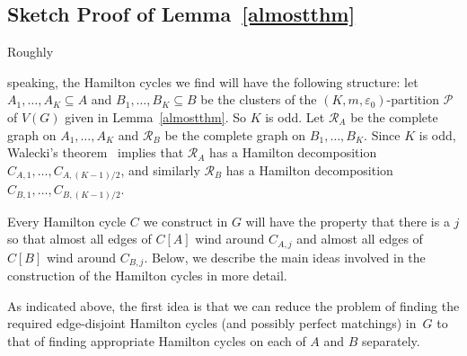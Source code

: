 \documentclass{memo-l}
\def\COMMENT#1{}
\def\eps{\varepsilon}
\def\epszero{\eps_0}
\numberwithin{section}{chapter}
\numberwithin{equation}{section}
\numberwithin{firstthm}{section}
\numberwithin{figure}{section}
\begin{document}
{\subsection{Sketch Proof of Lemma~\ref{almostthm}} \label{sec:sketchzz}
Roughly%
   \COMMENT{Deryk: new para}
speaking, the Hamilton cycles we find will have the following structure:
let $A_1,\dots,A_K\subseteq A$ and $B_1,\dots,B_K\subseteq B$ be the clusters of the $(K,m, \epszero)$-partition $\mathcal{P}$
of $V(G)$ given in Lemma~\ref{almostthm}. So $K$ is odd.
Let $\mathcal{R}_A$ be the complete graph on $A_1,\dots,A_K$ and $\mathcal{R}_B$ be the complete graph on $B_1,\dots,B_K$.
Since $K$ is odd, Walecki's theorem~\cite{lucas} implies that $\mathcal{R}_A$ has a Hamilton decomposition $C_{A,1}, \dots, C_{A,(K-1)/2}$, and similarly  $\mathcal{R}_B$
has a Hamilton decomposition $C_{B,1}, \dots, C_{B,(K-1)/2}$.%
\COMMENT{Andy: added last part of sentence.}
Every Hamilton cycle $C$ we construct in $G$ will have the property that there is a $j$ so that almost all edges of $C[A]$
wind around $C_{A,j}$ and almost all edges of $C[B]$ wind around $C_{B,j}$.
Below, we describe the main ideas involved in the construction of the Hamilton cycles in more detail.

As indicated above, the first idea is that we can reduce the problem of finding the required edge-disjoint Hamilton cycles (and possibly perfect matchings) in~$G$
to that of finding appropriate Hamilton cycles on each of $A$ and $B$ separately.

}
\end{document}
